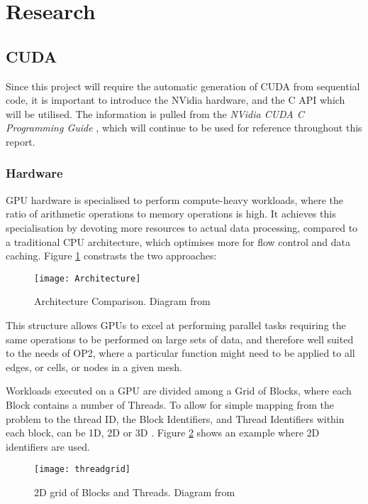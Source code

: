 
\section{Research}
\label{s:research}

\subsection{CUDA}
Since this project will require the automatic generation of CUDA from sequential code, it is important to introduce the NVidia hardware, and the C API which will be utilised. The information is pulled from the \textit{NVidia CUDA C Programming Guide} \cite{guide}, which will continue to be used for reference throughout this report.

\subsubsection{Hardware}
GPU hardware is specialised to perform compute-heavy workloads, where the ratio of arithmetic operations to memory operations is high. It achieves this specialisation by devoting more resources to actual data processing, compared to a traditional CPU architecture, which optimises more for flow control and data caching. Figure \ref{fig:arch} constrasts the two approaches:

\begin{figure}[h]
  \centering
  \texttt{[image: Architecture]}
  \caption{\label{fig:arch} Architecture Comparison. Diagram from \cite[p3]{guide}}
\end{figure}

\noindent This structure allows GPUs to excel at performing parallel tasks requiring the same operations to be performed on large sets of data, and therefore well suited to the needs of OP2, where a particular function might need to be applied to all edges, or cells, or nodes in a given mesh.
\par
Workloads executed on a GPU are divided among a Grid of Blocks, where each Block contains a number of Threads. To allow for simple mapping from the problem to the thread ID, the Block Identifiers, and Thread Identifiers within each block, can be 1D, 2D or 3D \cite[p9]{guide}. Figure \ref{fig:threadgrid} shows an example where 2D identifiers are used.\\
\begin{figure}[h!]
  \centering
  \texttt{[image: threadgrid]}
  \caption{\label{fig:threadgrid} 2D grid of Blocks and Threads. Diagram from \cite[p9]{guide}}
\end{figure}

